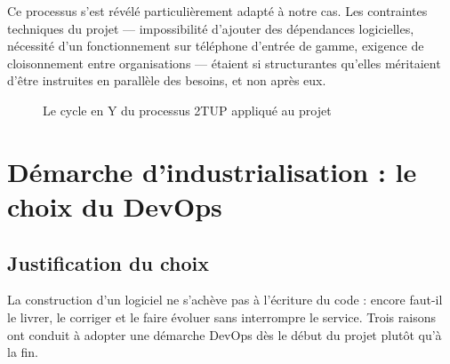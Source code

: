 Ce processus s'est révélé particulièrement adapté à notre cas. Les contraintes
techniques du projet — impossibilité d'ajouter des dépendances logicielles,
nécessité d'un fonctionnement sur téléphone d'entrée de gamme, exigence de
cloisonnement entre organisations — étaient si structurantes qu'elles méritaient
d'être instruites en parallèle des besoins, et non après eux.

\begin{figure}[htbp]
\centering
{}
\caption{Le cycle en Y du processus 2TUP appliqué au projet}
\label{fig:2tup}
\end{figure}

\section{Démarche d'industrialisation : le choix du DevOps}
\label{sec:devops}

\subsection{Justification du choix}

La construction d'un logiciel ne s'achève pas à l'écriture du code : encore
faut-il le livrer, le corriger et le faire évoluer sans interrompre le service.
Trois raisons ont conduit à adopter une démarche DevOps dès le début du projet
plutôt qu'à la fin.

